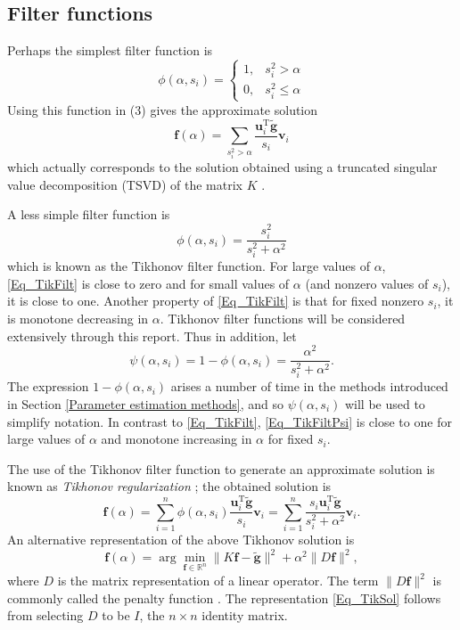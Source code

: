 \documentclass[12pt]{article}
\newcommand{\gnoise}{\widetilde{\mathbf{g}}}
\newcommand{\kmat}{K}	%
\newcommand{\fdis}{\mathbf{f}}
\newcommand{\trans}{\mathrm{T}}	%
\newcommand{\regparam}{\alpha}
\newcommand{\filt}{\phi}
\newcommand{\mfilt}{\psi}
\newcommand{\singular}{s}	%
\newcommand{\LSV}{\mathbf{u}}	%
\newcommand{\RSV}{\mathbf{v}}	%
\begin{document}
\subsection{Filter functions} \label{Filer functions}
Perhaps the simplest filter function is
\[\filt(\regparam,\singular_i) = \begin{cases}
1, & \singular_i^2 > \regparam \\
0, & \singular_i^2 \leq \regparam
\end{cases}\]
Using this function in (3) gives the approximate solution
\[\fdis(\regparam) = \sum_{\singular_i^2 > \regparam} \frac{{\LSV^\trans_i}\gnoise}{\singular_i}\RSV_i\]
which actually corresponds to the solution obtained using a truncated singular value decomposition (TSVD) of the matrix $\kmat$ \cite{Vogel:2002}. \par
A less simple filter function is
\begin{equation}
\filt(\regparam,\singular_i)  = \frac{\singular_i^2}{\singular_i^2 + \regparam^2}
\label{Eq_TikFilt}
\end{equation}
which is known as the Tikhonov filter function. For large values of $\regparam$, \eqref{Eq_TikFilt} is close to zero and for small values of $\regparam$ (and nonzero values of $\singular_i$), it is close to one. Another property of \eqref{Eq_TikFilt} is that for fixed nonzero $\singular_i$, it is monotone decreasing in $\regparam$. Tikhonov filter functions will be considered extensively through this report. Thus in addition, let
\begin{equation}
\mfilt(\regparam,\singular_i) = 1 - \filt(\regparam,\singular_i) = \frac{\regparam^2}{\singular_i^2 + \regparam^2}.
\label{Eq_TikFiltPsi}
\end{equation}
The expression $1 - \filt(\regparam,\singular_i)$ arises a number of time in the methods introduced in Section \ref{Parameter estimation methods}, and so $\mfilt(\regparam,\singular_i)$ will be used to simplify notation. In contrast to \eqref{Eq_TikFilt}, \eqref{Eq_TikFiltPsi} is close to one for large values of $\regparam$ and monotone increasing in $\regparam$ for fixed $\singular_i$. \par 
The use of the Tikhonov filter function to generate an approximate solution is known as \textit{Tikhonov regularization} \cite{Tikh1963}; the obtained solution is
\begin{equation}
\fdis(\regparam) = \sum_{i = 1}^n \filt(\regparam,\singular_i)\frac{{\LSV^\trans_i}\gnoise}{\singular_i}\RSV_i = \sum_{i = 1}^n \frac{\singular_i{\LSV^\trans_i}\gnoise}{\singular_i^2 + \regparam^2}\RSV_i.
\label{Eq_TikSol}
\end{equation}
An alternative representation of the above Tikhonov solution is
\begin{equation}
\fdis(\regparam) = \arg\min_{\fdis \in \mathbb{R}^n} \|\kmat\fdis - \gnoise\|^2 + \regparam^2\|D\fdis\|^2,
\end{equation}
where $D$ is the matrix representation of a linear operator. The term $\|D\fdis\|^2$ is commonly called the penalty function \cite{Vogel:2002}. The representation \eqref{Eq_TikSol} follows from selecting $D$ to be $I$, the $n \times n$ identity matrix. 
\end{document}
